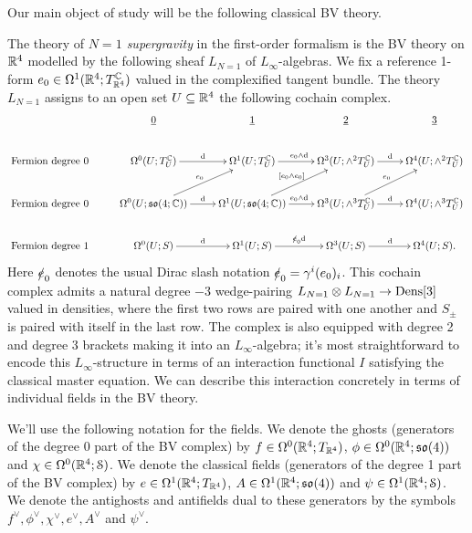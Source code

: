 \documentclass[10pt, oneside]{article}
\def\d{{\rm d}}
\begin{document}
Our main object of study will be the following classical BV theory.
\begin{definition}
The theory of \emph{$N=1$ supergravity} in the first-order formalism is the BV theory on $\mathbb{R}^4$ modelled by the following sheaf $L_{N=1}$ of $L_\infty$-algebras.  We fix a reference 1-form $e_0 \in \Omega^1(\mathbb{R}^4; T_{\mathbb{R}^4}^{\mathbb{C}})$ valued in the complexified tangent bundle.  The theory $L_{N=1}$ assigns to an open set $U \subseteq \mathbb{R}^4$ the following cochain complex.
\[\xymatrix{
& \underline{0} & \underline{1} & \underline{2} & \underline 3 \\
\mbox{Fermion degree }0 & \Omega^0(U; T^\CC_U) \ar[r]^\d & \Omega^1(U; T^\CC_U) \ar[r]^{e_0 \wedge \d} &\Omega^3(U; \wedge^2 T^\CC_U) \ar[r]^\d &\Omega^4(U; \wedge^2 T^\CC_U) \\
\mbox{Fermion degree }0 & \Omega^0(U; \so(4;\CC)) \ar[r]^\d \ar[ur]^{e_0} & \Omega^1(U; \so(4;\CC)) \ar[r]^{e_0 \wedge \d} \ar[ur]^{[e_0 \wedge e_0]} &\Omega^3(U; \wedge^3 T^\CC_U) \ar[r]^\d \ar[ur]^{e_0} &\Omega^4(U; \wedge^3 T^\CC_U) \\
\mbox{Fermion degree }1 & \Omega^0(U; S) \ar[r]^\d & \Omega^1(U; S) \ar[r]^{\sd e_0 \d} &\Omega^3(U; S) \ar[r]^\d &\Omega^4(U; S).
}\]
Here $\slashed{e}_0$ denotes the usual Dirac slash notation $\slashed{e}_0 = \gamma^i (e_0)_i$.  This cochain complex admits a natural degree $-3$ wedge-pairing $L_{N=1} \otimes L_{N=1} \to \mathrm{Dens}[3]$ valued in densities, where the first two rows are paired with one another and $S_\pm$ is paired with itself in the last row.  The complex is also equipped with degree 2 and degree 3 brackets making it into an $L_\infty$-algebra; it's most straightforward to encode this $L_\infty$-structure in terms of an interaction functional $I$ satisfying the classical master equation.  We can describe this interaction concretely in terms of individual fields in the BV theory.

We'll use the following notation for the fields.  We denote the ghosts (generators of the degree 0 part of the BV complex) by $f \in \Omega^0(\mathbb{R}^4;T_{\mathbb{R}^4})$, $\phi \in \Omega^0(\mathbb{R}^4;\mathfrak{so}(4))$ and $\chi \in \Omega^0(\mathbb{R}^4;\mathcal{S})$.  We denote the classical fields (generators of the degree 1 part of the BV complex) by $e \in \Omega^1(\mathbb{R}^4;T_{\mathbb{R}^4})$, $A \in \Omega^1(\mathbb{R}^4;\mathfrak{so}(4))$ and $\psi \in \Omega^1(\mathbb{R}^4;\mathcal{S})$.  We denote the antighosts and antifields dual to these generators by the symbols $f^\vee, \phi^\vee, \chi^\vee, e^\vee, A^\vee$ and $\psi^\vee$.


\end{definition}
\end{document}
